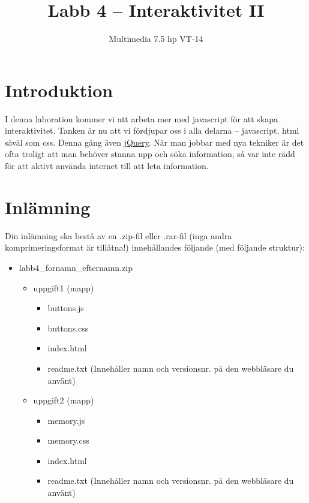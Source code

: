 \documentclass[12pt]{article}
\date{}
\title{ Labb 4 -- Interaktivitet II }
\author{ Multimedia 7.5 hp VT-14 }
\begin{document}
\maketitle
\vspace{-3.5em}



\section{Introduktion}
I denna laboration kommer vi att arbeta mer med javascript för att skapa interaktivitet. Tanken är nu att vi fördjupar oss i alla delarna -- javascript, html såväl som css. Denna gång även \href{http://jquery.com/}{jQuery}. När man jobbar med nya tekniker är det ofta troligt att man behöver stanna upp och söka information, så var inte rädd för att aktivt använda internet till att leta information.

\section{Inlämning}
Din inlämning ska bestå av en .zip-fil eller .rar-fil (inga andra komprimeringsformat är tillåtna!) innehållandes följande (med följande struktur):
  \begin{itemize}
    \item labb4\_fornamn\_efternamn.zip
      \vspace{-0.5em}
      \begin{itemize}
        \item uppgift1 (mapp)
          \begin{itemize}
            \item buttons.js
            \item buttons.css 
            \item index.html
            \item readme.txt (Innehåller namn och versionsnr. på den webbläsare du använt)
          \end{itemize}
	      \item uppgift2 (mapp)
          \begin{itemize}
            \item memory.js
            \item memory.css
            \item index.html
            \item readme.txt (Innehåller namn och versionsnr. på den webbläsare du använt)
          \end{itemize}
    \end{itemize}
  \end{itemize}
\end{document}
